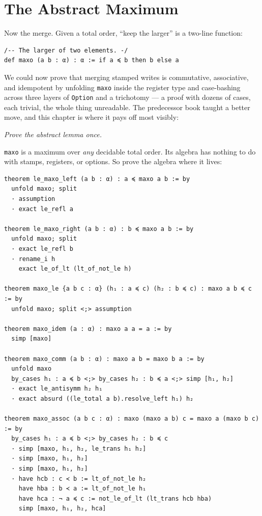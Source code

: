 \documentclass[12pt, a4paper, openright]{book}
\theoremstyle{thmstyle}
\theoremstyle{defstyle}
\newcommand{\lc}[1]{\texttt{#1}}
\begin{document}
\section{The Abstract Maximum}
\label{sec:maxo}

Now the merge. Given a total order, ``keep the larger'' is a
two-line function:

\begin{verbatim}
/-- The larger of two elements. -/
def maxo (a b : α) : α := if a ≼ b then b else a
\end{verbatim}

We could now prove that merging stamped writes is commutative,
associative, and idempotent by unfolding \lc{maxo} inside the register
type and case-bashing across three layers of \lc{Option} and a
trichotomy --- a proof with dozens of cases, each trivial, the whole
thing unreadable. The predecessor book taught a better move, and this
chapter is where it pays off most visibly:

\emph{Prove the abstract lemma once.}

\lc{maxo} is a maximum over \emph{any} decidable total order. Its
algebra has nothing to do with stamps, registers, or options. So prove
the algebra where it lives:

\begin{verbatim}
theorem le_maxo_left (a b : α) : a ≼ maxo a b := by
  unfold maxo; split
  · assumption
  · exact le_refl a

theorem le_maxo_right (a b : α) : b ≼ maxo a b := by
  unfold maxo; split
  · exact le_refl b
  · rename_i h
    exact le_of_lt (lt_of_not_le h)

theorem maxo_le {a b c : α} (h₁ : a ≼ c) (h₂ : b ≼ c) : maxo a b ≼ c := by
  unfold maxo; split <;> assumption

theorem maxo_idem (a : α) : maxo a a = a := by
  simp [maxo]

theorem maxo_comm (a b : α) : maxo a b = maxo b a := by
  unfold maxo
  by_cases h₁ : a ≼ b <;> by_cases h₂ : b ≼ a <;> simp [h₁, h₂]
  · exact le_antisymm h₂ h₁
  · exact absurd ((le_total a b).resolve_left h₁) h₂

theorem maxo_assoc (a b c : α) : maxo (maxo a b) c = maxo a (maxo b c) := by
  by_cases h₁ : a ≼ b <;> by_cases h₂ : b ≼ c
  · simp [maxo, h₁, h₂, le_trans h₁ h₂]
  · simp [maxo, h₁, h₂]
  · simp [maxo, h₁, h₂]
  · have hcb : c ≺ b := lt_of_not_le h₂
    have hba : b ≺ a := lt_of_not_le h₁
    have hca : ¬ a ≼ c := not_le_of_lt (lt_trans hcb hba)
    simp [maxo, h₁, h₂, hca]
\end{verbatim}
\end{document}
